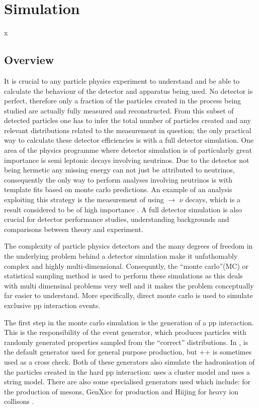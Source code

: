 
\section{Simulation}x
\setcounter{secnumdepth}{5}
\label{sec:Simulation}
\subsection{Overview}
It is crucial to any particle physics experiment to understand and be able to calculate the behaviour of the detector and apparatus being used.  No detector is perfect, therefore only a fraction of the particles created in the process being studied are actually fully measured and reconstructed.  From this subset of detected particles one has to infer the total number of particles created and any relevant distributions related to the measurement in question; the only practical way to calculate these detector efficiencies is with a full detector simulation.  One area of the \lhcb physics programme where detector simulation is of particularly great importance is semi leptonic decays involving neutrinos.  Due to the \lhcb detector not being hermetic any missing energy can not just be attributed to neutrinos, consequently the only way to perform analyses involving neutrinos is with template fits based on monte carlo predictions.  An example of an analysis exploiting this strategy is the measurement of \Vub using \Lb $\rightarrow$ \proton \muon $\nu$ decays, which is a result considered to be of high importance \cite{LHCb-PAPER-2015-013}.  A full detector simulation is also crucial for detector performance studies, understanding backgrounds and comparisons between theory and experiment.

The complexity of particle physics detectors and the many degrees of freedom in the underlying problem behind a detector simulation make it unfathomably complex and highly multi-dimensional.  Consequntly, the ``monte carlo''(MC) or statistical sampling method is used to perform these simulations as this deals with multi dimensinal problems very well and it makes the problem conceptually far easier to understand.  More specifically, direct monte carlo is used to simulate exclusive pp interaction events.

The first step in the monte carlo simulation is the generation of a pp interaction.  This is the responsibility of the event generator, which produces particles with randomly generated properties sampled from the ``correct'' distributions.  In \lhcb, \pythia is the default generator used for general purpose production, but \herwig++ is sometimes used as a cross check.  Both of these generators also simulate the hadronisation of the particles created in the hard pp interaction: \herwig uses a cluster model and \pythia uses a string model\cite{Sjostrand:2007gs,Herwig}.  There are also some specialised generators used which include: \bcvegpy for the production of \Bc mesons, GenXicc for \Xic production and Hiijing for heavy ion collisons \cite{bcvegpy,Gyulassy:1994ew,Chang:2007pp}.

